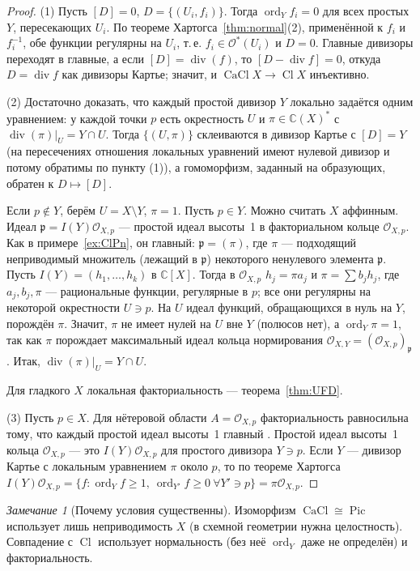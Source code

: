 \documentclass[11pt,a4paper]{article}
\theoremstyle{plain}
\theoremstyle{definition}
\theoremstyle{remark}
\newtheorem{remark}[theorem]{Замечание}
\renewcommand{\C}{\mathbb{C}}
\newcommand{\cO}{\mathcal{O}}
\newcommand{\pp}{\mathfrak{p}}
\DeclareMathOperator{\Pic}{Pic}
\DeclareMathOperator{\Cl}{Cl}
\DeclareMathOperator{\CaCl}{CaCl}
\DeclareMathOperator{\divv}{div}
\DeclareMathOperator{\ord}{ord}
\begin{document}
\begin{proof}
(1) Пусть $[D]=0$, $D=\{(U_i,f_i)\}$. Тогда $\ord_Y f_i=0$ для всех простых $Y$,
пересекающих $U_i$. По теореме Хартогса~\ref{thm:normal}(2), применённой к $f_i$ и $f_i^{-1}$,
обе функции регулярны на $U_i$, т.\,е. $f_i\in\cO^*(U_i)$ и $D=0$. Главные дивизоры переходят в
главные, а если $[D]=\divv(f)$, то $[D-\divv f]=0$, откуда $D=\divv f$ как дивизоры Картье;
значит, и $\CaCl X\to\Cl X$ инъективно.

(2) Достаточно доказать, что каждый простой дивизор $Y$ локально задаётся одним уравнением:
у каждой точки $p$ есть окрестность $U$ и $\pi\in\C(X)^*$ с $\divv(\pi)|_U=Y\cap U$. Тогда
$\{(U,\pi)\}$ склеиваются в дивизор Картье с $[D]=Y$ (на пересечениях отношения локальных
уравнений имеют нулевой дивизор и потому обратимы по пункту (1)), а гомоморфизм, заданный на
образующих, обратен к $D\mapsto[D]$.

Если $p\notin Y$, берём $U=X\setminus Y$, $\pi=1$. Пусть $p\in Y$. Можно считать $X$ аффинным.
Идеал $\pp=I(Y)\cO_{X,p}$ --- простой идеал высоты~1 в факториальном кольце $\cO_{X,p}$.
Как в примере~\ref{ex:ClPn}, он главный: $\pp=(\pi)$, где $\pi$ --- подходящий неприводимый множитель (лежащий в $\pp$)
некоторого ненулевого элемента $\pp$. Пусть $I(Y)=(h_1,\dots,h_k)$ в $\C[X]$. Тогда в $\cO_{X,p}$
$h_j=\pi a_j$ и $\pi=\sum b_jh_j$, где $a_j,b_j,\pi$ --- рациональные функции, регулярные в $p$;
все они регулярны на некоторой окрестности $U\ni p$. На $U$ идеал функций, обращающихся в нуль на
$Y$, порождён $\pi$. Значит, $\pi$ не имеет нулей на $U$ вне $Y$ (полюсов нет), а
$\ord_Y\pi=1$, так как $\pi$ порождает максимальный идеал кольца нормирования
$\cO_{X,Y}=(\cO_{X,p})_\pp$. Итак, $\divv(\pi)|_U=Y\cap U$.

Для гладкого $X$ локальная факториальность --- теорема~\ref{thm:UFD}.

(3) Пусть $p\in X$. Для нётеровой области $A=\cO_{X,p}$ факториальность равносильна
тому, что каждый простой идеал высоты~1 главный \cite[II.6.2A]{Ha}. Простой идеал высоты~1
кольца $\cO_{X,p}$ --- это $I(Y)\cO_{X,p}$ для простого дивизора $Y\ni p$. Если $Y$ --- дивизор
Картье с локальным уравнением $\pi$ около $p$, то по теореме Хартогса
$I(Y)\cO_{X,p}=\{f:\ord_Y f\ge1,\ \ord_{Y'}f\ge0\ \forall Y'\ni p\}=\pi\cO_{X,p}$.
\end{proof}

\begin{remark}[Почему условия существенны]
Изоморфизм $\CaCl\cong\Pic$ использует лишь неприводимость $X$ (в схемной геометрии нужна
целостность). Совпадение с $\Cl$ использует нормальность (без неё $\ord_Y$ даже не определён) и
факториальность.
\end{remark}
\end{document}
